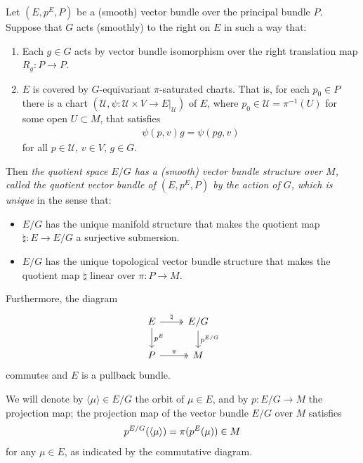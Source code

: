 \begin{proposition} \label{3.1.1}
Let $(E, p^E, P)$ be a (smooth) vector bundle over the principal bundle $P$. Suppose that $G$ acts (smoothly) to the right on $E$ in such a way that:
\begin{enumerate}
    \item Each $g \in G$ acts by vector bundle isomorphism over the right translation map $R_g: P \to P$.
    
    \item $E$ is covered by $G$-equivariant $\pi$-saturated charts. That is, for each $p_0 \in P$ there is a chart $(\mathcal U, \psi: \mathcal U \times V \to E|_{\mathcal U})$ of $E$, where $p_0 \in \mathcal U = \pi^{-1}(U)$ for some open $U \subset M$, that satisfies 
    \begin{align*}
        \psi(p, v)g = \psi(pg, v)
    \end{align*}
    for all $p \in \mathcal U$, $v \in V$, $g \in G$.
\end{enumerate}

Then \emph{the quotient space $E/G$ has a (smooth) vector bundle structure over $M$, called \emph{the quotient vector bundle of $(E, p^E, P)$ by the action of $G$}, which is unique} in the sense that:
\begin{itemize}
    \item $E/G$ has the unique manifold structure that makes the quotient map $\natural: E \to E/G$ a surjective submersion.
    \item $E/G$ has the unique topological vector bundle structure that makes the quotient map $\natural$ linear over $\pi: P \to M$.
\end{itemize}

Furthermore, the diagram
\begin{equation} \label{pullbackQuotient}
\begin{tikzcd}
    E \arrow[two heads]{r}{\natural} \arrow{d}{p^E} & E/G \arrow{d}{p^{E/G}} \\
    P \arrow[two heads]{r}{\pi}                     & M
\end{tikzcd}
\end{equation}
commutes and $E$ is a pullback bundle.

We will denote by $\langle \mu \rangle \in E/G$ the orbit of $\mu \in E$, and by $p:E/G \to M$ the projection map; the projection map of the vector bundle $E/G$ over $M$ satisfies 
\begin{align} \label{eqnProjectionOfQuotient}
    p^{E/G}(\left\langle \mu \right\rangle) = \pi(p^E(\mu)) \in M
\end{align}
for any $\mu \in E$, as indicated by the commutative diagram. 

\end{proposition}

